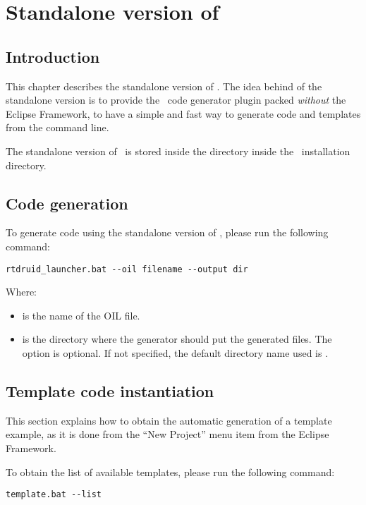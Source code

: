 \chapter{Standalone version of \rtd}
\label{cha:Commandline}

\section{Introduction}

This chapter describes the standalone version of \rtd. The idea behind
of the standalone version is to provide the \rtd\ code generator
plugin packed {\em without} the Eclipse Framework, to have a simple and
fast way to generate code and templates from the command line.

The standalone version of \rtd\ is stored inside the 
directory inside the \rtd\ installation directory.

\section{Code generation}
To generate code using the standalone version of \rtd, please run the
following command:

\begin{lstlisting}
rtdruid_launcher.bat --oil filename --output dir
\end{lstlisting}

\noindent Where:
\begin{itemize}
\item {} is the name of the OIL file.
\item {} is the directory where the generator should put the
  generated files. The  option is optional. If not
  specified, the default directory name used is .
\end{itemize}

\section{Template code instantiation}
This section explains how to obtain the automatic generation of a
template example, as it is done from the ``New Project'' menu item
from the Eclipse Framework.

To obtain the list of available templates, please run the following
command:

\begin{lstlisting}
template.bat --list
\end{lstlisting}

